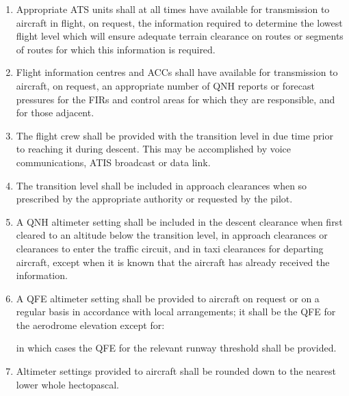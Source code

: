 \documentclass[../main.tex]{subfiles}
\begin{document}
    \begin{enumerate}
        \item Appropriate ATS units shall at all times have available for transmission to aircraft in flight, on request, the information required to determine the lowest flight level which will ensure adequate terrain clearance on routes or segments of routes for which this information is required.


        \item Flight information centres and ACCs shall have available for transmission to aircraft, on request, an appropriate number of QNH reports or forecast pressures for the FIRs and control areas for which they are responsible, and for those adjacent.
        \item The flight crew shall be provided with the transition level in due time prior to reaching it during descent. This may be accomplished by voice communications, ATIS broadcast or data link.
        \item The transition level shall be included in approach clearances when so prescribed by the appropriate authority or requested by the pilot.
        \item A QNH altimeter setting shall be included in the descent clearance when first cleared to an altitude below the transition level, in approach clearances or clearances to enter the traffic circuit, and in taxi clearances for departing aircraft, except when it is known that the aircraft has already received the information.
        \item A QFE altimeter setting shall be provided to aircraft on request or on a regular basis in accordance with local arrangements; it shall be the QFE for the aerodrome elevation except for:


        \noindent in which cases the QFE for the relevant runway threshold shall be provided.

        \item Altimeter settings provided to aircraft shall be rounded down to the nearest lower whole hectopascal.


\end{enumerate}
\end{document}

